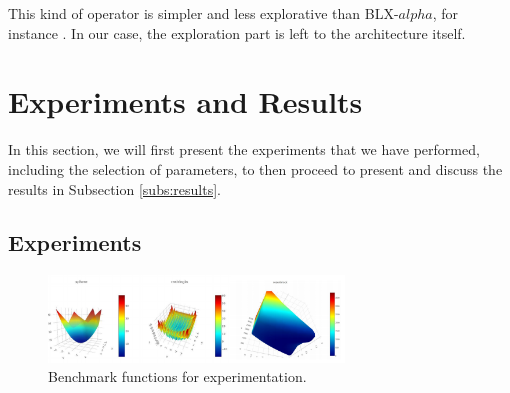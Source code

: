 \documentclass[runningheads]{llncs}
\begin{document}
This kind of operator is simpler and less explorative than
BLX-$alpha$, for instance \cite{picek2013recombination}. In our case,
the exploration part is left to the architecture itself.



  




  \section{Experiments and Results}
  \label{sec:exp}

  In this section, we will first present the experiments that we have performed,
  including the selection of parameters, to then proceed to present and discuss
  the results in Subsection \ref{subs:results}. 
    
  \subsection{Experiments}

\begin{figure}[htp] \centering
\includegraphics[width=0.7\textwidth]{img/benchmark.png} 
\caption{Benchmark
functions for experimentation.} 
\label{fig:functions} 
\end{figure} %
\end{document}
